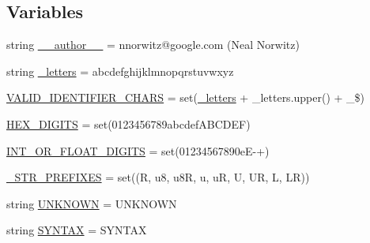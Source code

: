 \subsection*{Variables}
\begin{DoxyCompactItemize}
\item 
string \mbox{\hyperlink{namespacescripts_1_1generator_1_1cpp_1_1tokenize_afa788b0b29116321e9ea8f10fe3d9b3b}{\+\_\+\+\_\+author\+\_\+\+\_\+}} = \textquotesingle{}nnorwitz@google.\+com (Neal Norwitz)\textquotesingle{}
\item 
string \mbox{\hyperlink{namespacescripts_1_1generator_1_1cpp_1_1tokenize_a686a0147f093a2644d81dfb0f0783234}{\+\_\+letters}} = \textquotesingle{}abcdefghijklmnopqrstuvwxyz\textquotesingle{}
\item 
\mbox{\hyperlink{namespacescripts_1_1generator_1_1cpp_1_1tokenize_afe160178704f69c7f451a10b1195d31a}{V\+A\+L\+I\+D\+\_\+\+I\+D\+E\+N\+T\+I\+F\+I\+E\+R\+\_\+\+C\+H\+A\+RS}} = set(\mbox{\hyperlink{namespacescripts_1_1generator_1_1cpp_1_1tokenize_a686a0147f093a2644d81dfb0f0783234}{\+\_\+letters}} + \+\_\+letters.\+upper() + \textquotesingle{}\+\_\$\textquotesingle{})
\item 
\mbox{\hyperlink{namespacescripts_1_1generator_1_1cpp_1_1tokenize_a1761c588ca2c216dd3d7803a022ac182}{H\+E\+X\+\_\+\+D\+I\+G\+I\+TS}} = set(\textquotesingle{}0123456789abcdef\+A\+B\+C\+D\+E\+F\textquotesingle{})
\item 
\mbox{\hyperlink{namespacescripts_1_1generator_1_1cpp_1_1tokenize_a872d970d595b685444caf54ba825d91a}{I\+N\+T\+\_\+\+O\+R\+\_\+\+F\+L\+O\+A\+T\+\_\+\+D\+I\+G\+I\+TS}} = set(\textquotesingle{}01234567890e\+E-\/+\textquotesingle{})
\item 
\mbox{\hyperlink{namespacescripts_1_1generator_1_1cpp_1_1tokenize_a89f3410f006394ebf7523643a073c7c9}{\+\_\+\+S\+T\+R\+\_\+\+P\+R\+E\+F\+I\+X\+ES}} = set((\textquotesingle{}R\textquotesingle{}, \textquotesingle{}u8\textquotesingle{}, \textquotesingle{}u8R\textquotesingle{}, \textquotesingle{}u\textquotesingle{}, \textquotesingle{}uR\textquotesingle{}, \textquotesingle{}U\textquotesingle{}, \textquotesingle{}UR\textquotesingle{}, \textquotesingle{}L\textquotesingle{}, \textquotesingle{}LR\textquotesingle{}))
\item 
string \mbox{\hyperlink{namespacescripts_1_1generator_1_1cpp_1_1tokenize_a7bdecdb6bfdaa3a88b26e30d96ec6102}{U\+N\+K\+N\+O\+WN}} = \textquotesingle{}U\+N\+K\+N\+O\+WN\textquotesingle{}
\item 
string \mbox{\hyperlink{namespacescripts_1_1generator_1_1cpp_1_1tokenize_acf1e3927c8d9070a9968036b882f8b1b}{S\+Y\+N\+T\+AX}} = \textquotesingle{}S\+Y\+N\+T\+AX\textquotesingle{}

\end{DoxyCompactItemize}
